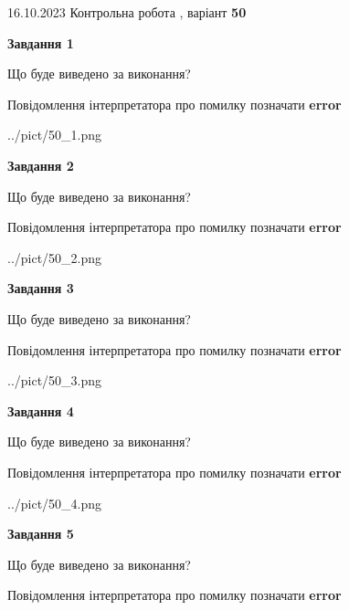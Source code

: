 \documentclass[12pt, ukrainian]{article}
\begin{document}
{\Large{16.10.2023 Контрольна робота , варіант  \No \textbf { 50 }\par}}
{
\begin {large}
{\begin {center}\textbf{Завдання 1}\end {center}}\par
Що буде виведено за виконання? \par
Повідомлення інтерпретатора про помилку позначати \textbf{error}

\begin{center}
	{../pict/50_1.png}
\end{center}
\newpage

{\begin {center}\textbf{Завдання 2}\end {center}}\par
Що буде виведено за виконання? \par
Повідомлення інтерпретатора про помилку позначати \textbf{error}

\begin{center}
	{../pict/50_2.png}
\end{center}
\newpage

{\begin {center}\textbf{Завдання 3}\end {center}}\par
Що буде виведено за виконання? \par
Повідомлення інтерпретатора про помилку позначати \textbf{error}

\begin{center}
	{../pict/50_3.png}
\end{center}
\newpage

{\begin {center}\textbf{Завдання 4}\end {center}}\par
Що буде виведено за виконання? \par
Повідомлення інтерпретатора про помилку позначати \textbf{error}

\begin{center}
	{../pict/50_4.png}
\end{center}
\newpage

{\begin {center}\textbf{Завдання 5}\end {center}}\par
Що буде виведено за виконання? \par
Повідомлення інтерпретатора про помилку позначати \textbf{error}


\end{large}}
\end{document}
